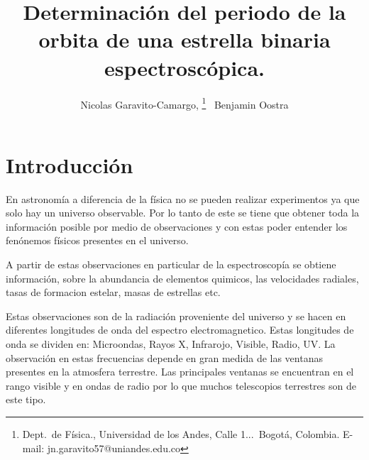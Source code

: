 \documentclass[Proceedings]{ascelike}
\begin{document}
%
\title{Determinaci\'on del periodo de la orbita de una estrella binaria espectrosc\'opica.}
%
\author{
Nicolas Garavito-Camargo,%
%
\thanks{
Dept.\ de F\'isica.,
Universidad de los Andes, 
Calle 1...\ Bogot\'a, Colombia. E-mail: jn.garavito57@uniandes.edu.co}
\ Benjamin Oostra\footnotemark[1]
%
%
%
%
%
%
}
%
\maketitle
%

\section{Introducci\'on}

En astronom\'ia a diferencia de la f\'isica no se pueden realizar experimentos ya
que solo hay un universo observable. Por lo tanto de este se tiene que obtener 
toda la informaci\'on posible por medio de observaciones y con estas poder entender 
los fen\'onemos f\'isicos presentes en el universo.

A partir de estas observaciones en particular de la espectroscop\'ia se obtiene informaci\'on,
sobre la abundancia de elementos quimicos, las velocidades radiales, tasas de formacion estelar, 
masas de estrellas etc.

Estas observaciones son de la radiaci\'on proveniente del universo y se hacen
 en diferentes longitudes de onda del espectro electromagnetico. Estas longitudes 
 de onda se dividen en: Microondas, Rayos X, Infrarojo, Visible, Radio, UV. La observaci\'on 
 en estas frecuencias depende en gran medida de las ventanas presentes en la atmosfera terrestre.
Las principales ventanas se encuentran en el rango visible y en ondas de radio por lo que muchos telescopios terrestres son de este tipo. 
\end{document}
